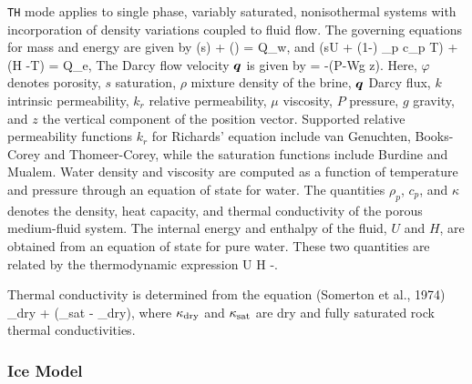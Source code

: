 {\tt TH} mode applies to single phase, variably saturated, nonisothermal systems
with incorporation of density variations coupled to fluid flow. 
The governing equations for mass and energy are given by
\EQ\label{masseqn}
\left(\varphi s\rho\right) + \bnabla\cdot\left(\rho\bq\right) = Q_w,
\EN
and
\EQ
{}\big(\varphi s\rho U + (1-\varphi) \rho_p c_p T\big) + \bnabla\cdot\big(\rho\bq H -\kappa \bnabla T\big) = Q_e,
\EN
The Darcy flow velocity $\boldsymbol{q}$ is given by
\EQ
\bq = -\bnabla\left(P-W\rho g z\right).
\EN
Here, $\varphi$ denotes porosity, $s$ saturation, $\rho$ mixture density of the brine, $\boldsymbol{q}$ Darcy flux, $k$ intrinsic permeability, $k_r$ relative permeability, $\mu$ viscosity, $P$ pressure, $g$ gravity, and $z$ the vertical component of the position vector.  Supported relative permeability functions $k_r$ for Richards' equation include van Genuchten, Books-Corey and Thomeer-Corey, while the saturation functions include Burdine and Mualem.  Water density and viscosity are computed as a function of temperature and pressure through an equation of state for water. The quantities  $\rho_p$, $c_p$, and $\kappa$ denotes the  density, heat capacity, and thermal conductivity of the porous medium-fluid system. The internal energy and enthalpy of the fluid, $U$ and $H$, are obtained from an equation of state for pure water. These two quantities are related by the thermodynamic expression
\EQ
U \eq H -.
\EN

Thermal conductivity is determined from the equation (Somerton et al., 1974)  
\EQ\label{cond1} 
\kappa \eq \kappa_{\rm dry} +  (\kappa_{\rm sat} - \kappa_{\rm dry}), 
\EN 
where $\kappa_{\rm dry}$ and $\kappa_{\rm sat}$ are dry and fully saturated rock thermal conductivities. 

\subsubsection{Ice Model}


